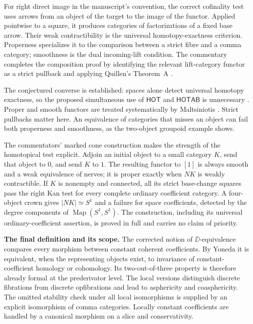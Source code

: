 For right direct image in the manuscript's convention, the correct cofinality test uses arrows from an object of the target to the image of the functor. Applied pointwise to a square, it produces categories of factorizations of a fixed base arrow. Their weak contractibility is the universal homotopy-exactness criterion. Properness specializes it to the comparison between a strict fibre and a comma category; smoothness is the dual incoming-lift condition. The commentary completes the composition proof by identifying the relevant lift-category functor as a strict pullback and applying Quillen's Theorem~A \citep[\S1]{Quillen1973}.

The conjectured converse is established: spaces alone detect universal homotopy exactness, so the proposed simultaneous use of $\mathsf{HOT}$ and $\mathsf{HOTAB}$ is unnecessary \citep[Theorem~3.16]{GrothPontoShulman2014}. Proper and smooth functors are treated systematically by Maltsiniotis \citep[Theorem~1.2]{Maltsiniotis2005Asphericite}. Strict pullbacks matter here. An equivalence of categories that misses an object can fail both properness and smoothness, as the two-object groupoid example shows.

The commentators' marked cone construction makes the strength of the homotopical test explicit. Adjoin an initial object to a small category $K$, send that object to $0$, and send $K$ to $1$. The resulting functor to $[1]$ is always smooth and a weak equivalence of nerves; it is proper exactly when $NK$ is weakly contractible. If $K$ is nonempty and connected, all its strict base-change squares pass the right Kan test for every complete ordinary coefficient category. A four-object crown gives $|NK|\simeq S^1$ and a failure for space coefficients, detected by the degree components of $\operatorname{Map}(S^1,S^1)$. The construction, including its universal ordinary-coefficient assertion, is proved in full and carries no claim of priority.

\medskip\noindent\textbf{The final definition and its scope.}
The corrected notion of $\DD$-equivalence compares every morphism between constant coherent coefficients. By Yoneda it is equivalent, when the representing objects exist, to invariance of constant-coefficient homology or cohomology. Its two-out-of-three property is therefore already formal at the prederivator level. The local versions distinguish discrete fibrations from discrete opfibrations and lead to asphericity and coasphericity. The omitted stability check under all local isomorphisms is supplied by an explicit isomorphism of comma categories. Locally constant coefficients are handled by a canonical morphism on a slice and conservativity.

